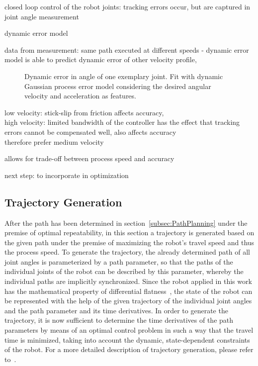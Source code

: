\documentclass[5p,times,procedia]{elsarticle}
\begin{document}
closed loop control of the robot joints: tracking errors occur, but are captured in joint angle measurement

dynamic error model

data from measurement: same path executed at different speeds - dynamic error model is able to predict dynamic error of other velocity profile,

\begin{figure}[h]
	\centering
	
	\caption{Dynamic error in angle of one exemplary joint. Fit with dynamic Gaussian process error model considering the desired angular velocity and acceleration as features.}
	\label{fig:error_sources}
\end{figure}

low velocity: stick-slip from friction affects accuracy,\\
high velocity: limited bandwidth of the controller has the effect that tracking errors cannot be compensated well, also affects accuracy \\
therefore prefer medium velocity

allows for trade-off between process speed and accuracy



next step: to incorporate in optimization

\subsection{Trajectory Generation}
After the path has been determined in section~\ref{subsec:PathPlanning} under the premise of optimal repeatability, in this section a trajectory is generated based on the given path under the premise of maximizing the robot’s travel speed and thus the process speed.
To generate the trajectory, the already determined path of all joint angles is parameterized by a path parameter, so that the paths of the individual joints of the robot can be described by this parameter, whereby the individual paths are implicitly synchronized.
Since the robot applied in this work has the mathematical property of differential flatness~\cite{Hoffmann23}, the state of the robot can be represented with the help of the given trajectory of the individual joint angles and the path parameter and its time derivatives.
In order to generate the trajectory, it is now sufficient to determine the time derivatives of the path parameters by means of an optimal control problem in such a way that the travel time is minimized, taking into account the dynamic, state-dependent constraints of the robot. 
For a more detailed description of trajectory generation, please refer to~\cite{Kanagalingam24}.
 
\end{document}
